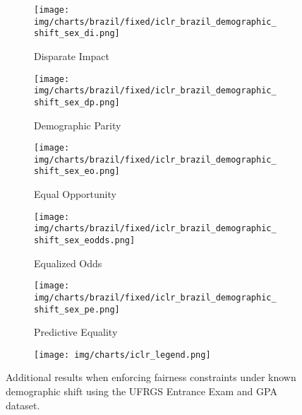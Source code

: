 \begin{figure*}[h]
    \begin{subfigure}[b]{1\linewidth}
        \texttt{[image: img/charts/brazil/fixed/iclr\_brazil\_demographic\_shift\_sex\_di.png]}
        \caption{Disparate Impact}
    \end{subfigure} 
    \begin{subfigure}[b]{1\linewidth}
        \texttt{[image: img/charts/brazil/fixed/iclr\_brazil\_demographic\_shift\_sex\_dp.png]}
        \caption{Demographic Parity}
    \end{subfigure}
    \begin{subfigure}[b]{1\linewidth}
        \texttt{[image: img/charts/brazil/fixed/iclr\_brazil\_demographic\_shift\_sex\_eo.png]}
        \caption{Equal Opportunity}
    \end{subfigure} 
    \begin{subfigure}[b]{1\linewidth}
        \texttt{[image: img/charts/brazil/fixed/iclr\_brazil\_demographic\_shift\_sex\_eodds.png]}
        \caption{Equalized Odds}
    \end{subfigure} 
    \begin{subfigure}[b]{1\linewidth}
        \texttt{[image: img/charts/brazil/fixed/iclr\_brazil\_demographic\_shift\_sex\_pe.png]}
        \caption{Predictive Equality}
    \end{subfigure} 
    \begin{subfigure}[b]{1\linewidth}
        \texttt{[image: img/charts/iclr\_legend.png]}
    \end{subfigure}
    \caption{Additional results when enforcing fairness constraints under known demographic shift
using the UFRGS Entrance Exam and GPA dataset.
}
\end{figure*}

